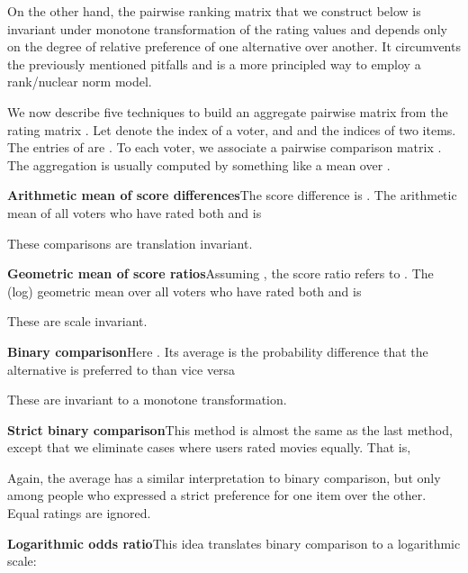 \documentclass{sig-alternate}
\begin{document}
On the other hand, the pairwise ranking matrix that
we construct below is invariant under monotone transformation
of the rating values and depends only on the degree of
relative preference of one alternative over another.
It circumvents the previously mentioned pitfalls and is
a more principled way to employ a rank/nuclear norm model.

We now describe five techniques to build an aggregate pairwise
matrix  from the rating matrix .  
Let  denote the index of a voter, and  and  the 
indices of two items.  The entries of  are .
To each voter, we associate a pairwise comparison matrix .
The aggregation
is usually computed by something like a mean over .



\begin{compactenum}
\item \textbf{Arithmetic mean of score differences}\quad The score difference
is . The arithmetic mean
of all voters who have rated both  and  is

These comparisons  are translation invariant.

\item \textbf{Geometric mean of score ratios}\quad Assuming , the score ratio
refers to . The (log) geometric
mean over all voters who have rated both  and  is

These are  scale invariant.

\item \textbf{Binary comparison}\quad Here . Its average is the probability difference
that the alternative  is preferred to  than vice versa

These are invariant to a monotone transformation.

\item \textbf{Strict binary comparison}\quad This method is almost the same
as the last method, except that we eliminate cases where users rated
movies equally.  That is, 

Again, the average  has a similar interpretation to
binary comparison, but only among people who expressed a strict 
preference for one item over the other.  
Equal ratings are ignored.

\item \textbf{Logarithmic odds ratio}\quad This idea translates
binary comparison to a logarithmic scale:

\end{compactenum}
\end{document}
